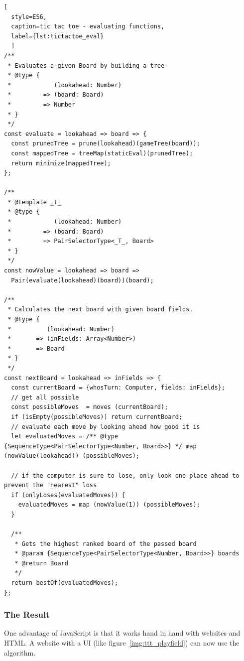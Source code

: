 \begin{lstlisting}[
  style=ES6, 
  caption=tic tac toe - evaluating functions,
  label={lst:tictactoe_eval}
  ]
/**
 * Evaluates a given Board by building a tree
 * @type {
 *            (lookahead: Number)
 *         => (board: Board)
 *         => Number
 * }
 */
const evaluate = lookahead => board => {
  const prunedTree = prune(lookahead)(gameTree(board));
  const mappedTree = treeMap(staticEval)(prunedTree);
  return minimize(mappedTree);
};

/**
 * @template _T_
 * @type {
 *            (lookahead: Number)
 *         => (board: Board)
 *         => PairSelectorType<_T_, Board>
 * }
 */
const nowValue = lookahead => board =>
  Pair(evaluate(lookahead)(board))(board);

/**
 * Calculates the next board with given board fields.
 * @type {
 *          (lookahead: Number)
 *       => (inFields: Array<Number>)
 *       => Board
 * }
 */
const nextBoard = lookahead => inFields => {
  const currentBoard = {whosTurn: Computer, fields: inFields};
  // get all possible
  const possibleMoves  = moves (currentBoard);
  if (isEmpty(possibleMoves)) return currentBoard;
  // evaluate each move by looking ahead how good it is
  let evaluatedMoves = /** @type {SequenceType<PairSelectorType<Number, Board>>} */ map (nowValue(lookahead)) (possibleMoves);

  // if the computer is sure to lose, only look one place ahead to prevent the "nearest" loss
  if (onlyLoses(evaluatedMoves)) {
    evaluatedMoves = map (nowValue(1)) (possibleMoves);
  }

  /**
   * Gets the highest ranked board of the passed board
   * @param {SequenceType<PairSelectorType<Number, Board>>} boards
   * @return Board
   */
  return bestOf(evaluatedMoves);
};
\end{lstlisting}

\subsubsection{The Result} %
\label{sec:ttt_result}
One advantage of JavaScript is that it works hand in hand with websites and
HTML. A website with a UI (like figure~\ref{img:ttt_playfield}) can now use the
algorithm.\\

